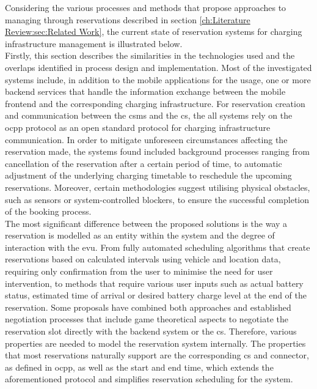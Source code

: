 Considering the various processes and methods that propose approaches to managing  through reservations described in section \ref{ch:Literature Review:sec:Related Work}, the current state of reservation systems for charging infrastructure management is illustrated below. \\
\noindent Firstly, this section describes the similarities in the technologies used and the overlaps identified in process design and implementation.
Most of the investigated systems include, in addition to the mobile applications for the  usage, one or more backend services that handle the information exchange between the mobile frontend and the corresponding charging infrastructure.
For reservation creation and communication between the \acrshort{csms} and the \acrshort{cs}, the all systems rely on the \acrshort{ocpp} protocol as an open standard protocol for charging infrastructure communication.
In order to mitigate unforeseen circumstances affecting the reservation made, the systems found included background processes ranging from cancellation of the reservation after a certain period of time, to automatic adjustment of the underlying charging timetable to reschedule the upcoming reservations.
Moreover, certain methodologies suggest utilising physical obstacles, such as sensors or system-controlled blockers, to ensure the successful completion of the booking process. \\
\noindent The most significant difference between the proposed solutions is the way a reservation is modelled as an entity within the system and the degree of interaction with the \acrshort{evu}.
From fully automated scheduling algorithms that create reservations based on calculated intervals using vehicle and location data, requiring only confirmation from the user to minimise the need for user intervention, to methods that require various user inputs such as actual battery status, estimated time of arrival or desired battery charge level at the end of the reservation.
Some proposals have combined both approaches and established negotiation processes that include game theoretical aspects to negotiate the reservation slot directly with the backend system or the \acrshort{cs}.
Therefore, various properties are needed to model the reservation system internally. The properties that most reservations naturally support are the corresponding \acrshort{cs} and connector, as defined in \acrshort{ocpp}, as well as the start and end time, which extends the aforementioned protocol and simplifies reservation scheduling for the system. \\
